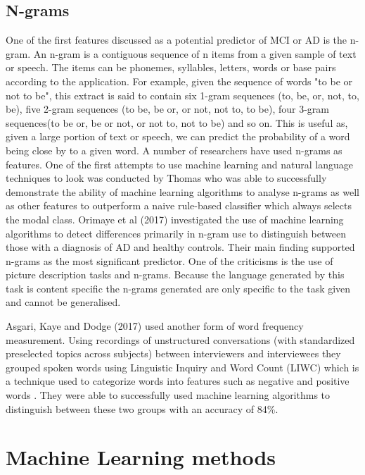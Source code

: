 \documentclass[12pt]{article}
\begin{document}
\subsection{N-grams}
One of the first features discussed as a potential predictor of MCI or AD is the n-gram. An n-gram is a contiguous sequence of n items from a given sample of text or speech. The items can be phonemes, syllables, letters, words or base pairs according to the application. For example, given the sequence of words "to be or not to be", this extract is said to contain six 1-gram sequences (to, be, or, not, to, be), five 2-gram sequences (to be, be or, or not, not to, to be), four 3-gram sequences(to be or, be or not, or not to, not to be) and so on. This is useful as, given a large portion of text or speech, we can predict the probability of a word being close by to a given word. A number of researchers have used n-grams as features. One of the first attempts to use machine learning and natural language techniques to look was conducted by Thomas \cite{Thomas2005} who was able to successfully demonstrate the ability of machine learning algorithms to analyse n-grams as well as other features to outperform a naive rule-based classifier which always selects the modal class. Orimaye et al (2017) \cite{Orimaye2017} investigated the use of machine learning algorithms to detect differences primarily in n-gram use to distinguish between those with a diagnosis of AD and healthy controls. Their main finding supported n-grams as the most significant predictor. One of the criticisms is the use of picture description tasks and n-grams. Because the language generated by this task is content specific the n-grams generated are only specific to the task given and cannot be generalised. \newline
\par
Asgari, Kaye and Dodge (2017) \cite{Asgari2017} used another form of word frequency measurement. Using recordings of unstructured conversations (with standardized preselected topics across subjects) between interviewers and interviewees they grouped spoken words using Linguistic Inquiry and Word Count (LIWC) which is a technique used to categorize words into features such as negative and positive words \cite{Pennebaker2015}. They were able to successfully used machine learning algorithms to distinguish between these two groups with an accuracy of 84\%. \newline


\section{Machine Learning methods}
\end{document}
